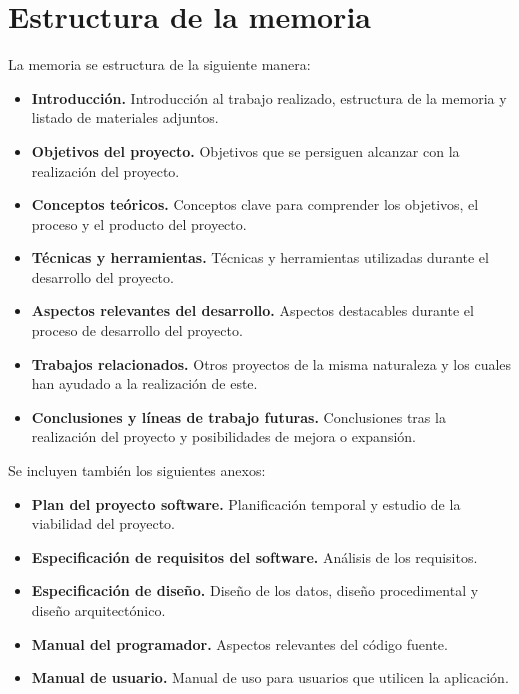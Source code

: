 \section{Estructura de la memoria}
La memoria se estructura de la siguiente manera\cite{ubu_plantilla_2019}:
\begin{itemize}
	\tightlist
	\item
	\textbf{Introducción.} Introducción al trabajo realizado, estructura de la memoria y listado de materiales adjuntos.
	\item
	\textbf{Objetivos del proyecto.} Objetivos que se persiguen alcanzar con la realización del proyecto.
	\item
	\textbf{Conceptos teóricos.} Conceptos clave para comprender los objetivos, el proceso y el producto del proyecto.
	\item
	\textbf{Técnicas y herramientas.} Técnicas y herramientas utilizadas durante el desarrollo del proyecto.
	\item
	\textbf{Aspectos relevantes del desarrollo.} Aspectos destacables durante el proceso de desarrollo del proyecto.
	\item
	\textbf{Trabajos relacionados.} Otros proyectos de la misma naturaleza y los cuales han ayudado a la realización de este.
	\item
	\textbf{Conclusiones y líneas de trabajo futuras.} Conclusiones tras la realización del proyecto y posibilidades de mejora o expansión.
\end{itemize}
Se incluyen también los siguientes anexos:
\begin{itemize}
	\tightlist
	\item
	\textbf{Plan del proyecto software.} Planificación temporal y estudio de la viabilidad del proyecto.
	\item
	\textbf{Especificación de requisitos del software.} Análisis de los requisitos.
	\item
	\textbf{Especificación de diseño.} Diseño de los datos, diseño procedimental y diseño arquitectónico.
	\item
	\textbf{Manual del programador.} Aspectos relevantes del código fuente.
	\item
	\textbf{Manual de usuario.} Manual de uso para usuarios que utilicen la aplicación.
\end{itemize}